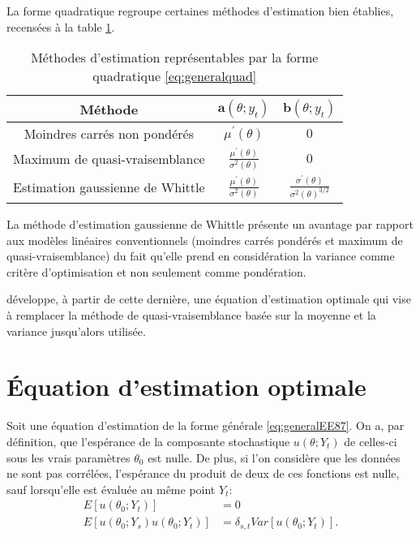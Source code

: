 La forme quadratique regroupe certaines méthodes d'estimation bien
établies, recensées à la table \ref{tab:methodesquad}.
\begin{table}[!ht]
  
  \centering
  \begin{tabular}{ccc}
    \hline
    \textbf{Méthode} & $\mathbf{a}(\theta;y_t)$ & $\mathbf{b}(\theta;y_t)$ \\
    \hline
    Moindres carrés non pondérés & $\mu^{\prime}\left( \theta \right)$ & $0$ \\
    Maximum de quasi-vraisemblance & $\frac{\mu^{\prime}\left( \theta \right)}{ \sigma^2\left( \theta \right)}$ & $0$ \\
    Estimation gaussienne de Whittle
    \citep{fox1986large} & $\frac{\mu^{\prime}\left( \theta \right)}{ \sigma^2\left( \theta \right)}$ & $\frac{\sigma^{\prime}\left( \theta \right)}{ \sigma^2\left( \theta \right)^{3/2}}$ \\
    \hline
  \end{tabular}
  \caption{Méthodes d'estimation représentables par la forme quadratique \eqref{eq:generalquad}
  }\label{tab:methodesquad}
\end{table}

La méthode d'estimation gaussienne de Whittle présente un avantage par
rapport aux modèles linéaires conventionnels (moindres carrés pondérés
et maximum de quasi-vraisemblance) du fait qu'elle prend en
considération la variance comme critère d'optimisation et non
seulement comme pondération.

\cite{crowder1987linear} développe, à partir de cette dernière, 
une équation d'estimation optimale qui vise à
remplacer la méthode de quasi-vraisemblance basée sur la moyenne et la
variance jusqu'alors utilisée.

\section{Équation d'estimation optimale}
\label{sec:equationsquadopt}

Soit une équation d'estimation de la forme générale
\eqref{eq:generalEE87}. On a, par définition, que l'espérance de la
composante stochastique $u(\theta;Y_t)$ de celles-ci sous les vrais
paramètres $\theta_0$ est nulle. De plus, si l'on considère que les
données ne sont pas corrélées, l'espérance du produit de deux de ces
fonctions est nulle, sauf lorsqu'elle est évaluée au même point $Y_t$:
\begin{align}
  \label{eq:Crowder86-th4.1-def}
  E \left[u(\theta_0;Y_t) \right] &= 0 \\
  E \left[u(\theta_0;Y_s)u(\theta_0;Y_t) \right] &=
  \delta_{s,t}Var\left[u(\theta_0;Y_t)\right].
\end{align}

